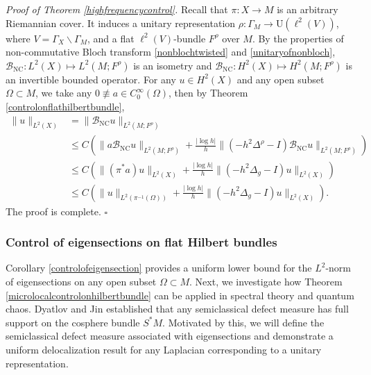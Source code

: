 \documentclass[11pt,oneside,reqno]{amsart}
\theoremstyle{definition}
\numberwithin{equation}{section}
\theoremstyle{plain}
\begin{document}
\noindent \textit{Proof of Theorem \ref{highfrequencycontrol}.} Recall that $\pi:X\to M$ is an arbitrary Riemannian cover. It induces a unitary representation $\rho:\Gamma_{M}\to \mathrm{U}(\ell^2(V))$, where $V=\Gamma_{X}\backslash \Gamma_{M}$, and a flat $\ell^2(V)$-bundle $F^{\rho}$ over $M$. By the properties of non-commutative Bloch transform \eqref{nonblochtwisted} and \eqref{unitaryofnonbloch}, $\mathcal{B}_{\mathrm{NC}}: L^2(X)\mapsto L^2(M;F^{\rho})$ is an isometry and $\mathcal{B}_{\mathrm{NC}}: H^2(X)\mapsto H^2(M;F^{\rho})$ is an invertible bounded operator. 
For any $u \in H^2(X)$ and any open subset $\Omega \subset M$, we take any $0\not \equiv a\in C_{0}^{\infty}(\Omega)$, then by Theorem \ref{controlonflathilbertbundle},
\begin{equation}
\begin{aligned}
\|u\|_{L^2(X)}&=\|\mathcal{B}_{\mathrm{NC}}u\|_{L^2(M;F^{\rho})}\\
&\leq C\left(\|a\mathcal{B}_{\mathrm{NC}}u\|_{L^2(M;F^{\rho})}+\frac{|\log h|}{h}\|(-h^2\Delta^{\rho}-I)\mathcal{B}_{\mathrm{NC}}u\|_{L^2(M;F^{\rho})}\right)\\
&\leq C\left(\|(\pi^{*}a)u\|_{L^2(X)}+\frac{|\log h|}{h}\|(-h^2\Delta_g-I)u\|_{L^2(X)}\right)\\
&\leq C\left(\|u\|_{L^2(\pi^{-1}(\Omega))}+\frac{|\log h|}{h}\|(-h^2\Delta_g-I)u\|_{L^2(X)}\right).
\end{aligned}
\end{equation}
The proof is complete. \hfill $\square$


\subsubsection{Control of eigensections on flat Hilbert bundles}

Corollary \ref{controlofeigensection} provides a uniform lower bound for the $L^2$-norm of eigensections on any open subset $\Omega\subset M$. Next, we investigate how Theorem \ref{microlocalcontrolonhilbertbundle} can be applied in spectral theory and quantum chaos. Dyatlov and Jin \cite[Theorem 1]{dyatlov2018semiclassical} established that any semiclassical defect measure has full support on the cosphere bundle $S^*M$. Motivated by this, we will define the semiclassical defect measure associated with eigensections and demonstrate a uniform delocalization result for any Laplacian corresponding to a unitary representation.
\end{document}
